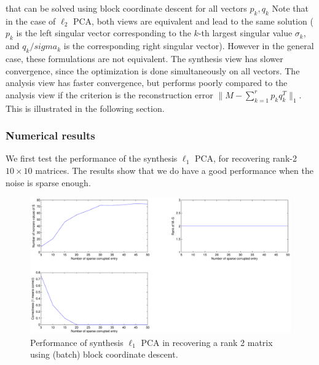 that can be solved using block coordinate descent for all vectors $p_k, q_k$
Note that in the case of $\ell_2$ PCA, both views are equivalent and lead to the same solution ($p_k$ is the left singular vector corresponding to the $k$-th largest singular value $\sigma_k$, and $q_k / sigma_k$ is the corresponding right singular vector). However in the general case, these formulations are not equivalent. The synthesis view has slower convergence, since the optimization is done simultaneously on all vectors. The analysis view has faster convergence, but performs poorly compared to the analysis view if the criterion is the reconstruction error $\| M - \sum_{k=1}^{r} p_k q_k^T \|_1$. This is illustrated in the following section.

\newpage
\subsubsection{Numerical results}
We first test the performance of the synthesis $\ell_1$ PCA, for recovering rank-2 $10\times 10$ matrices. The results show that we do have a good performance when the noise is sparse enough.
%
\begin{figure}[h!]
\centering
\includegraphics[width=\textwidth]{../figures/rank2case.pdf}
\caption{Performance of synthesis $\ell_1$ PCA in recovering a rank 2 matrix using (batch) block coordinate descent.}
\label{fig:rank2}
\end{figure}

